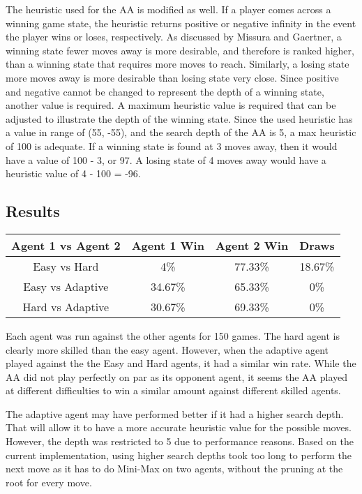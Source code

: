 \documentclass[12pt]{article}
\begin{document}
The heuristic used for the AA is modified as well. If a player comes across a winning game state, the heuristic returns positive or negative infinity in the event the player wins or loses, respectively. As discussed by Missura and Gaertner, a winning state fewer moves away is more desirable, and therefore is ranked higher, than a winning state that requires more moves to reach. Similarly, a losing state more moves away is more desirable than losing state very close. Since positive and negative cannot be changed to represent the depth of a winning state, another value is required. A maximum heuristic value is required that can be adjusted to illustrate the depth of the winning state. Since the used heuristic has a value in range of (55, -55), and the search depth of the AA is 5, a max heuristic of 100 is adequate. If a winning state is found at 3 moves away, then it would have a value of 100 - 3, or 97. A losing state of 4 moves away would have a heuristic value of 4 - 100 = -96.


\subsection*{Results}
\begin{center}
    \begin{tabular}{ | c | c | c | c | }
        \hline
        Agent 1 vs Agent 2 & Agent 1 Win & Agent 2 Win & Draws \\
        \hline
        Easy vs Hard & 4\% & 77.33\% & 18.67\% \\
        \hline
        Easy vs Adaptive & 34.67\% & 65.33\% & 0\% \\
        \hline
        Hard vs Adaptive & 30.67\% & 69.33\% & 0\% \\
        \hline
    \end{tabular}
\end{center}

Each agent was run against the other agents for 150 games. The hard agent is clearly more skilled than the easy agent. However, when the adaptive agent played against the the Easy and Hard agents, it had a similar win rate. While the AA did not play perfectly on par as its opponent agent, it seems the AA played at different difficulties to win a similar amount against different skilled agents.

The adaptive agent may have performed better if it had a higher search depth. That will allow it to have a more accurate heuristic value for the possible moves. However, the depth was restricted to 5 due to performance reasons. Based on the current implementation, using higher search depths took too long to perform the next move as it has to do Mini-Max on two agents, without the pruning at the root for every move.
\end{document}
